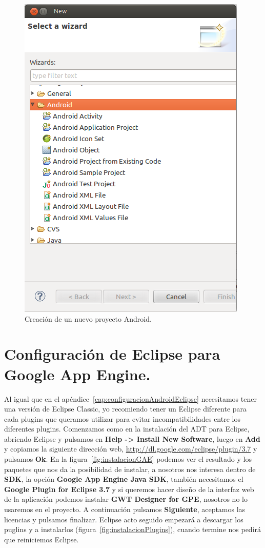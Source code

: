 \begin{figure}
  \centering
    \includegraphics[scale=0.6]{./ConfiguracionEclipse/imagenes/nuevoProyectoAndroid.png}
  \caption{Creación de un nuevo proyecto Android.}
  \label{fig:nuevoProyectoAndroid}
\end{figure}

\section{Configuración de Eclipse para Google App Engine.}

Al igual que en el apéndice~\ref{cap:configuracionAndroidEclipse} necesitamos tener una versión de Eclipse Classic, yo recomiendo tener un Eclipse diferente para cada plugins que queramos utilizar para evitar incompatibilidades entre los diferentes plugins. Comenzamos como en la instalación del ADT para Eclipse, abriendo Eclipse y pulsamos en \textbf{Help -> Install New Software}, luego en \textbf{Add} y copiamos la siguiente dirección web, \url{http://dl.google.com/eclipse/plugin/3.7} y pulsamos \textbf{Ok}. En la figura~\ref{fig:instalacionGAE} podemos ver el resultado y los paquetes que nos da la posibilidad de instalar, a nosotros nos interesa dentro de \textbf{SDK}, la opción \textbf{Google App Engine Java SDK}, también necesitamos el \textbf{Google Plugin for Eclipse 3.7} y si queremos hacer diseño de la interfaz web de la aplicación podemos instalar \textbf{GWT Designer for GPE}, nosotros no lo usaremos en el proyecto. A continuación pulsamos \textbf{Siguiente}, aceptamos las licencias y pulsamos finalizar. Eclipse acto seguido empezará a descargar los puglins y a instalarlos (figura~\ref{fig:instalacionPlugins}), cuando termine nos pedirá que reiniciemos Eclipse.


